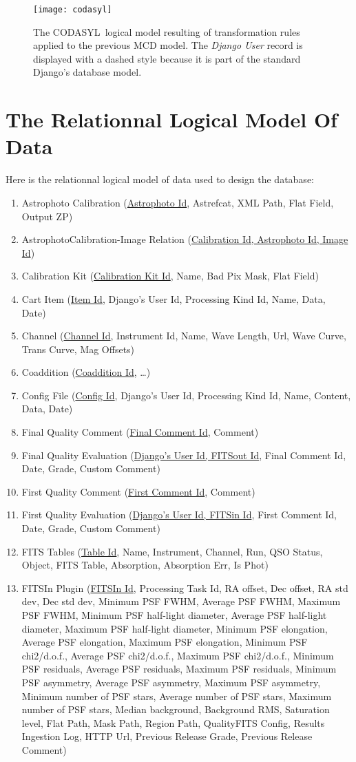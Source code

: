 \documentclass[twoside,a4paper]{article}
\def \codasyl {{\sc CODASYL\ }}
\begin{document}
\begin{figure}[p]
\centering
\texttt{[image: codasyl]}
\caption[The \codasyl Logical Model]{The \codasyl logical model resulting of transformation rules applied to the previous {\sc MCD} model. The \emph{Django User} record is displayed with a dashed style because it is part of the standard Django's database model.}
\label{fig:codasyl}
\end{figure}

\section{The Relationnal Logical Model Of Data}
Here is the relationnal logical model of data used to design the database:

\begin{enumerate}
\sc
\item Astrophoto Calibration (\underline{Astrophoto Id}, Astrefcat, XML Path, Flat Field, Output ZP)
\item AstrophotoCalibration-Image Relation (\underline{Calibration Id, Astrophoto Id, Image Id})
\item Calibration Kit (\underline{Calibration Kit Id}, Name, Bad Pix Mask, Flat Field)
\item Cart Item (\underline{Item Id}, Django's User Id, Processing Kind Id, Name, Data, Date)
\item Channel (\underline{Channel Id}, Instrument Id, Name, Wave Length, Url, Wave Curve, Trans Curve, Mag Offsets)
\item Coaddition (\underline{Coaddition Id}, \ldots{})
\item Config File (\underline{Config Id}, Django's User Id, Processing Kind Id, Name, Content, Data, Date)
\item Final Quality Comment (\underline{Final Comment Id}, Comment)
\item Final Quality Evaluation (\underline{Django's User Id, FITSout Id}, Final Comment Id, Date, Grade, Custom Comment)
\item First Quality Comment (\underline{First Comment Id}, Comment)
\item First Quality Evaluation (\underline{Django's User Id, FITSin Id}, First Comment Id, Date, Grade, Custom Comment)
\item FITS Tables (\underline{Table Id}, Name, Instrument, Channel, Run, QSO Status, Object, FITS Table, Absorption, Absorption Err, Is Phot)
\item FITSIn Plugin (\underline{FITSIn Id}, Processing Task Id, RA offset, Dec offset, RA std dev, Dec std dev, Minimum PSF FWHM, Average PSF FWHM, Maximum PSF FWHM, Minimum PSF half-light diameter, Average PSF half-light diameter, Maximum PSF half-light diameter, Minimum PSF elongation, Average PSF elongation, Maximum PSF elongation, Minimum PSF chi2/d.o.f., Average PSF chi2/d.o.f., Maximum PSF chi2/d.o.f., Minimum PSF residuals, Average PSF residuals, Maximum PSF residuals, Minimum PSF asymmetry, Average PSF asymmetry, Maximum PSF asymmetry, Minimum number of PSF stars, Average number of PSF stars, Maximum number of PSF stars, Median background, Background RMS, Saturation level, Flat Path, Mask Path, Region Path, QualityFITS Config, Results Ingestion Log, HTTP Url, Previous Release Grade, Previous Release Comment)

\end{enumerate}
\end{document}
